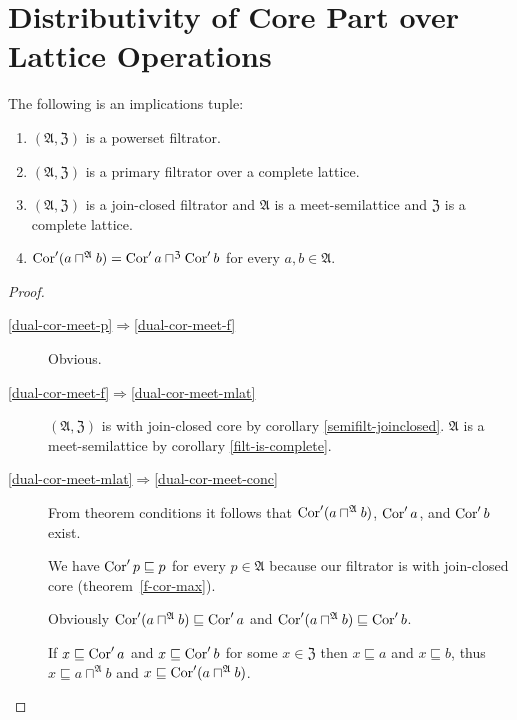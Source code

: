\section{Distributivity of Core Part over Lattice Operations}
\begin{thm}
\label{dual-cor-meet}The following is an implications tuple:
\begin{enumerate}
\item \label{dual-cor-meet-p}$(\mathfrak{A},\mathfrak{Z})$ is a powerset
filtrator.
\item \label{dual-cor-meet-f}$(\mathfrak{A},\mathfrak{Z})$ is a primary
filtrator over a complete lattice.
\item \label{dual-cor-meet-mlat}$(\mathfrak{A},\mathfrak{Z})$ is a join-closed
filtrator and $\mathfrak{A}$ is a meet-semilattice and $\mathfrak{Z}$
is a complete lattice.
\item \label{dual-cor-meet-conc}$\operatorname{Cor}'(a\sqcap^{\mathfrak{A}}b)=\operatorname{Cor}'a\sqcap^{\mathfrak{Z}}\operatorname{Cor}'b$
for every $a,b\in\mathfrak{A}$.
\end{enumerate}
\end{thm}
\begin{proof}
~
\begin{description}
\item [{\ref{dual-cor-meet-p}$\Rightarrow$\ref{dual-cor-meet-f}}] Obvious.
\item [{\ref{dual-cor-meet-f}$\Rightarrow$\ref{dual-cor-meet-mlat}}] $(\mathfrak{A},\mathfrak{Z})$
is with join-closed core by corollary \ref{semifilt-joinclosed}.
$\mathfrak{A}$ is a meet-semilattice by corollary \ref{filt-is-complete}.
\item [{\ref{dual-cor-meet-mlat}$\Rightarrow$\ref{dual-cor-meet-conc}}] From
theorem conditions it follows that $\operatorname{Cor}'(a\sqcap^{\mathfrak{A}}b)$, $\operatorname{Cor}'a$, and $\operatorname{Cor}'b$
exist.


We have $\operatorname{Cor}'p\sqsubseteq p$ for every $p\in\mathfrak{A}$ because
our filtrator is with join-closed core (theorem~\ref{f-cor-max}).


Obviously $\operatorname{Cor}'(a\sqcap^{\mathfrak{A}}b)\sqsubseteq\operatorname{Cor}'a$ and $\operatorname{Cor}'(a\sqcap^{\mathfrak{A}}b)\sqsubseteq\operatorname{Cor}'b$.


If $x\sqsubseteq\operatorname{Cor}'a$ and $x\sqsubseteq\operatorname{Cor}'b$ for some $x\in\mathfrak{Z}$
then $x\sqsubseteq a$ and $x\sqsubseteq b$, thus $x\sqsubseteq a\sqcap^{\mathfrak{A}}b$
and $x\sqsubseteq\operatorname{Cor}'(a\sqcap^{\mathfrak{A}}b)$.

\end{description}
\end{proof}
